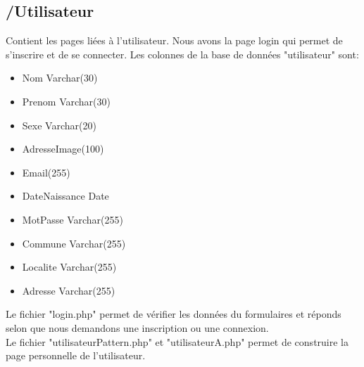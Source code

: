 \documentclass[a4paper]{article}
\begin{document}
	\subsection{/Utilisateur}
		Contient les pages liées à l'utilisateur. Nous avons la page login qui permet de s'inscrire et de se connecter. Les colonnes de la base de données "utilisateur" sont:
		\begin{itemize}
			\item Nom Varchar(30)
			\item Prenom Varchar(30)
			\item Sexe Varchar(20)
			\item AdresseImage(100)
			\item Email(255)
			\item DateNaissance Date
			\item MotPasse Varchar(255)
			\item Commune Varchar(255)
			\item Localite Varchar(255)
			\item Adresse Varchar(255)
		\end{itemize}
	Le fichier "login.php" permet de vérifier les données du formulaires et réponds selon que nous demandons une inscription ou une connexion.
	\\
	Le fichier "utilisateurPattern.php" et "utilisateurA.php" permet de construire la page personnelle de l'utilisateur.
\end{document}
